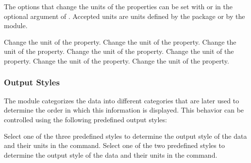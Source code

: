 \documentclass{chemmacros-manual}
\begin{document}
The options that change the units of the properties can be set with
 or in the optional argument of . Accepted units
are units defined by the  package or by the  module.
\begin{options}
    Change the unit of the  property.
    Change the unit of the  property.
    Change the unit of the  property.
    Change the unit of the  property.
    Change the unit of the  property.
    Change the unit of the  property.
    Change the unit of the  property.
\end{options} 

\begin{example}
   \par
\end{example}



\subsubsection{Output Styles}\label{sec:output-styles}

The  module categorizes the data into different categories that are later used 
to determine the order in which this information is displayed. This behavior can be controlled using
the following predefined output styles:

\begin{options}
  Select one of the three predefined styles to determine the output style of the data and 
  their units in the  command.
  Select one of the two predefined styles to determine the output style of the data and 
  their units in the  command.
\end{options}
\end{document}

